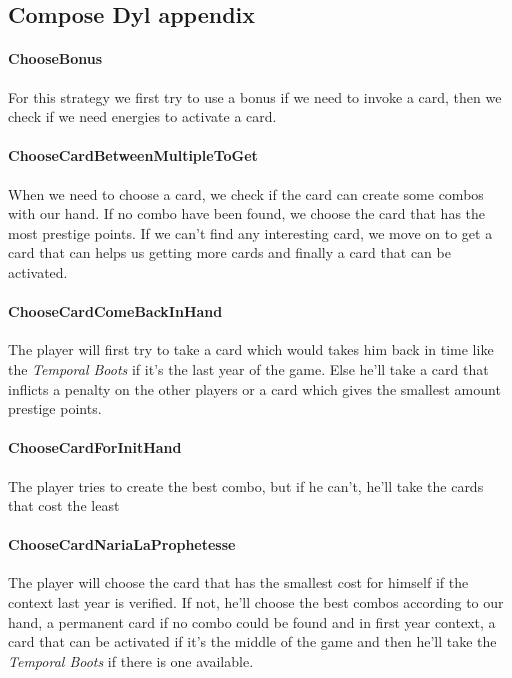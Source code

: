 \begin{appendices}
\section{Compose Dyl appendix}\label{appendix:compose_dyl_appendix}

\paragraph{ChooseBonus}
For this strategy we first try to use a bonus if we need to invoke a card, then we check if we need energies to activate a card.

\paragraph{ChooseCardBetweenMultipleToGet}
When we need to choose a card, we check if the card can create some combos with our hand. If no combo have been found, we choose the card that has the most prestige points. If we can't find any interesting card, we move on to get a card that can helps us getting more cards and finally a card that can be activated.

\paragraph{ChooseCardComeBackInHand}
The player will first try to take a card which would takes him back in time like the \textit{Temporal Boots} if it's the last year of the game. Else he'll take a card that inflicts a penalty on the other players or a card which gives the smallest amount prestige points.

\paragraph{ChooseCardForInitHand}
The player tries to create the best combo, but if he can't, he'll take the cards that cost the least

\paragraph{ChooseCardNariaLaProphetesse}
The player will choose the card that has the smallest cost for himself if the context last year is verified. If not, he'll choose the best combos according to our hand, a permanent card if no combo could be found and in first year context, a card that can be activated if it's the middle of the game and then he'll take the \textit{Temporal Boots} if there is one available.


\end{appendices}
